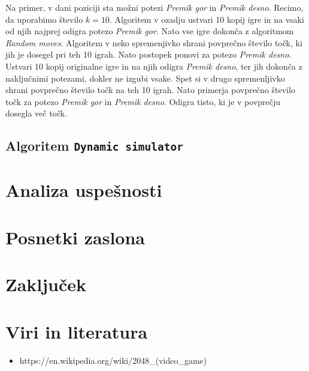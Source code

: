 \documentclass{article}
\begin{document}
Na primer, v dani poziciji sta možni potezi \emph{Premik gor} in \emph{Premik desno}. Recimo, da uporabimo število $k=10$. Algoritem v ozadju ustvari 10 kopij igre in na vsaki od njih najprej odigra potezo \emph{Premik gor}. Nato vse igre dokonča z algoritmom \emph{Random moves}. Algoritem v neko spremenjivko shrani povprečno število točk, ki jih je dosegel pri teh 10 igrah. Nato postopek ponovi za potezo \emph{Premik desno}. Ustvari 10 kopij originalne igre in na njih odigra \emph{Premik desno}, ter jih dokonča z naključnimi potezami, dokler ne izgubi vsake. Spet si v drugo spremenljivko shrani povprečno število točk na teh 10 igrah. Nato primerja povprečno število točk za potezo \emph{Premik gor} in \emph{Premik desno}. Odigra tisto, ki je v povprečju dosegla več točk.

\subsection{Algoritem \texttt{Dynamic simulator}}

\section{Analiza uspešnosti}

\section{Posnetki zaslona}

\section{Zaključek}

\section{Viri in literatura}
\begin{itemize}
    \item https://en.wikipedia.org/wiki/2048_(video_game)
\end{itemize}
\end{document}
